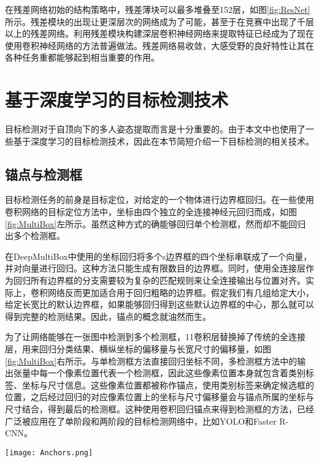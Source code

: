 在残差网络初始的结构策略中，残差薄块可以最多堆叠至152层，如图\ref{fig:ResNet}所示。残差模块的出现让更深层次的网络成为了可能，甚至于在竞赛中出现了千层以上的残差网络。利用残差模块构建深层卷积神经网络来提取特征已经成为了现在使用卷积神经网络的方法普遍做法。残差网络易收敛，大感受野的良好特性让其在各种任务重都能够起到相当重要的作用。

\section{基于深度学习的目标检测技术}
\label{sec:factsobjectdetection}
目标检测对于自顶向下的多人姿态提取而言是十分重要的。由于本文中也使用了一些基于深度学习的目标检测技术，因此在本节简短介绍一下目标检测的相关技术。

\subsection{锚点与检测框}
\label{subsec:factsanchors}
目标检测任务的前身是目标定位，对给定的一个物体进行边界框回归\cite{ILSVRC15}。在一些使用卷积网络的目标定位方法中，坐标由四个独立的全连接神经元回归而成，如图\ref{fig:MultiBox}左所示。虽然这种方式的确能够回归单个检测框，然而却不能回归出多个检测框。

在DeepMultiBox中使用的坐标回归\cite{erhan2014scalable}将多个s边界框的四个坐标串联成了一个向量，并对向量进行回归。这种方法只能生成有限数目的边界框。同时，使用全连接层作为回归所有边界框的分支需要较为复杂的匹配规则来让全连接输出与位置对齐。实际上，卷积网络反而更加适合用于回归粗略的边界框。假定我们有几组给定大小，给定长宽比的默认边界框，如果能够回归得到这些默认边界框的中心，那么就可以得到完整的检测结果。因此，锚点的概念就油然而生。

为了让网络能够在一张图中检测到多个检测框，1\times1卷积层替换掉了传统的全连接层，用来回归分类结果、横纵坐标的偏移量与长宽尺寸的偏移量，如图\ref{fig:MultiBox}右所示。与单检测框方法直接回归坐标不同，多检测框方法中的输出张量中每一个像素位置代表一个检测框，因此这些像素位置本身就包含着类别标签、坐标与尺寸信息。这些像素位置都被称作锚点，使用类别标签来确定候选框的位置，之后经过回归的对应像素位置上的坐标与尺寸偏移量会与锚点所属的坐标与尺寸结合，得到最后的检测框。这种使用卷积回归锚点来得到检测框的方法，已经广泛被应用在了单阶段和两阶段的目标检测网络中，比如YOLO\cite{redmon2016you}和Faster R-CNN\cite{Ren2015Faster}。

\begin{figure*}[htbp]	
	\centering
	\texttt{[image: Anchors.png]}
	\caption{基于卷积神经网络的单检测框(左)与多检测框(右)方法}
	\label{fig:MultiBox}
\end{figure*}

